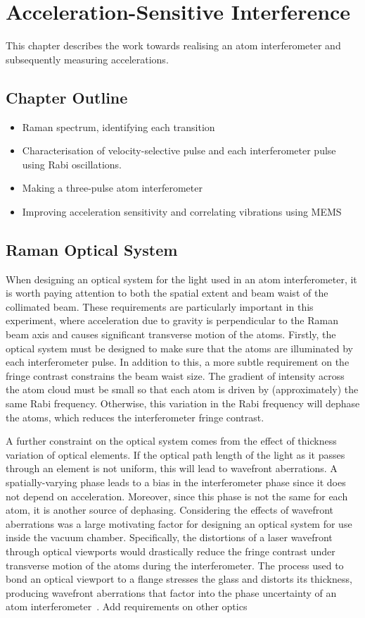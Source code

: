 \chapter{Acceleration-Sensitive Interference}\label{chap:atom_int}
This chapter describes the work towards realising an atom interferometer and
subsequently measuring accelerations.
\section{Chapter Outline}
\begin{itemize}
	\item Raman spectrum, identifying each transition
	\item Characterisation of velocity-selective pulse and each interferometer pulse using Rabi oscillations.
	\item Making a three-pulse atom interferometer
	\item Improving acceleration sensitivity and correlating vibrations using MEMS
\end{itemize}
\section{Raman Optical System}\label{sec:setup_ramanoptics}

When designing an optical system for the light used in an atom
interferometer, it is worth paying attention to both the spatial extent and
beam waist of the collimated beam. These requirements are particularly
important in this experiment, where acceleration due to gravity is
perpendicular to the Raman beam axis and causes significant transverse motion
of the atoms. Firstly, the optical system must be designed to make sure that
the atoms are illuminated by each interferometer pulse. In addition to this,
a more subtle requirement on the fringe contrast constrains the beam waist
size. The gradient of intensity across the atom cloud must be small so that
each atom is driven by (approximately) the same Rabi frequency. Otherwise,
this variation in the Rabi frequency will dephase the atoms, which reduces
the interferometer fringe contrast.
\par\noindent
A further constraint on the optical system comes from the effect of thickness
variation of optical elements. If the optical path length of the light as it
passes through an element is not uniform, this will lead to wavefront
aberrations. A spatially-varying phase leads to a bias in the interferometer
phase since it does not depend on acceleration. Moreover, since this phase is
not the same for each atom, it is another source of dephasing. Considering
the effects of wavefront aberrations was a large motivating factor for
designing an optical system for use inside the vacuum chamber. Specifically,
the distortions of a laser wavefront through optical viewports would
drastically reduce the fringe contrast under transverse motion of the atoms
during the interferometer. The process used to bond an optical viewport to a
flange stresses the glass and distorts its thickness, producing wavefront
aberrations that factor into the phase uncertainty of an atom
interferometer~\cite{Schkolnik2015}.
{\huge Add requirements on other optics}

